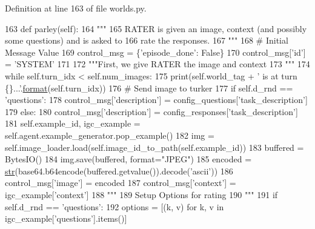 Definition at line 163 of file worlds.\+py.


\begin{DoxyCode}
163     \textcolor{keyword}{def }parley(self):
164         \textcolor{stringliteral}{"""}
165 \textcolor{stringliteral}{        RATER is given an image, context (and possibly some questions) and is asked to}
166 \textcolor{stringliteral}{        rate the responses.}
167 \textcolor{stringliteral}{        """}
168         \textcolor{comment}{# Initial Message Value}
169         control\_msg = \{\textcolor{stringliteral}{'episode\_done'}: \textcolor{keyword}{False}\}
170         control\_msg[\textcolor{stringliteral}{'id'}] = \textcolor{stringliteral}{'SYSTEM'}
171 
172         \textcolor{stringliteral}{"""First, we give RATER the image and context}
173 \textcolor{stringliteral}{        """}
174         \textcolor{keywordflow}{while} self.turn\_idx < self.num\_images:
175             print(self.world\_tag + \textcolor{stringliteral}{' is at turn \{\}...'}.\hyperlink{namespaceparlai_1_1chat__service_1_1services_1_1messenger_1_1shared__utils_a32e2e2022b824fbaf80c747160b52a76}{format}(self.turn\_idx))
176             \textcolor{comment}{# Send image to turker}
177             \textcolor{keywordflow}{if} self.d\_rnd == \textcolor{stringliteral}{'questions'}:
178                 control\_msg[\textcolor{stringliteral}{'description'}] = config\_questions[\textcolor{stringliteral}{'task\_description'}]
179             \textcolor{keywordflow}{else}:
180                 control\_msg[\textcolor{stringliteral}{'description'}] = config\_responses[\textcolor{stringliteral}{'task\_description'}]
181             self.example\_id, igc\_example = self.agent.example\_generator.pop\_example()
182             img = self.image\_loader.load(self.image\_id\_to\_path(self.example\_id))
183             buffered = BytesIO()
184             img.save(buffered, format=\textcolor{stringliteral}{"JPEG"})
185             encoded = \hyperlink{namespacegenerate__task__READMEs_a5b88452ffb87b78c8c85ececebafc09f}{str}(base64.b64encode(buffered.getvalue()).decode(\textcolor{stringliteral}{'ascii'}))
186             control\_msg[\textcolor{stringliteral}{'image'}] = encoded
187             control\_msg[\textcolor{stringliteral}{'context'}] = igc\_example[\textcolor{stringliteral}{'context'}]
188             \textcolor{stringliteral}{"""}
189 \textcolor{stringliteral}{                Setup Options for rating}
190 \textcolor{stringliteral}{            """}
191             \textcolor{keywordflow}{if} self.d\_rnd == \textcolor{stringliteral}{'questions'}:
192                 options = [(k, v) \textcolor{keywordflow}{for} k, v \textcolor{keywordflow}{in} igc\_example[\textcolor{stringliteral}{'questions'}].items()]

\end{DoxyCode}
